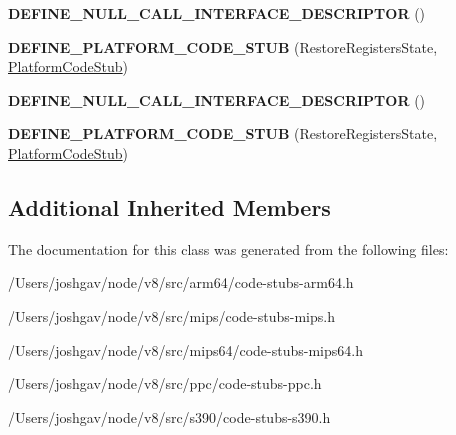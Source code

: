 \begin{DoxyCompactItemize}
\item 
{\bfseries D\+E\+F\+I\+N\+E\+\_\+\+N\+U\+L\+L\+\_\+\+C\+A\+L\+L\+\_\+\+I\+N\+T\+E\+R\+F\+A\+C\+E\+\_\+\+D\+E\+S\+C\+R\+I\+P\+T\+OR} ()\hypertarget{classv8_1_1internal_1_1_restore_registers_state_stub_ad6078d999bf4bc05859c3383b8b806f1}{}\label{classv8_1_1internal_1_1_restore_registers_state_stub_ad6078d999bf4bc05859c3383b8b806f1}

\item 
{\bfseries D\+E\+F\+I\+N\+E\+\_\+\+P\+L\+A\+T\+F\+O\+R\+M\+\_\+\+C\+O\+D\+E\+\_\+\+S\+T\+UB} (Restore\+Registers\+State, \hyperlink{classv8_1_1internal_1_1_platform_code_stub}{Platform\+Code\+Stub})\hypertarget{classv8_1_1internal_1_1_restore_registers_state_stub_a713ec890992c39eb89c6334070f5dbe4}{}\label{classv8_1_1internal_1_1_restore_registers_state_stub_a713ec890992c39eb89c6334070f5dbe4}

\item 
{\bfseries D\+E\+F\+I\+N\+E\+\_\+\+N\+U\+L\+L\+\_\+\+C\+A\+L\+L\+\_\+\+I\+N\+T\+E\+R\+F\+A\+C\+E\+\_\+\+D\+E\+S\+C\+R\+I\+P\+T\+OR} ()\hypertarget{classv8_1_1internal_1_1_restore_registers_state_stub_ad6078d999bf4bc05859c3383b8b806f1}{}\label{classv8_1_1internal_1_1_restore_registers_state_stub_ad6078d999bf4bc05859c3383b8b806f1}

\item 
{\bfseries D\+E\+F\+I\+N\+E\+\_\+\+P\+L\+A\+T\+F\+O\+R\+M\+\_\+\+C\+O\+D\+E\+\_\+\+S\+T\+UB} (Restore\+Registers\+State, \hyperlink{classv8_1_1internal_1_1_platform_code_stub}{Platform\+Code\+Stub})\hypertarget{classv8_1_1internal_1_1_restore_registers_state_stub_a713ec890992c39eb89c6334070f5dbe4}{}\label{classv8_1_1internal_1_1_restore_registers_state_stub_a713ec890992c39eb89c6334070f5dbe4}

\end{DoxyCompactItemize}
\subsection*{Additional Inherited Members}


The documentation for this class was generated from the following files\+:\begin{DoxyCompactItemize}
\item 
/\+Users/joshgav/node/v8/src/arm64/code-\/stubs-\/arm64.\+h\item 
/\+Users/joshgav/node/v8/src/mips/code-\/stubs-\/mips.\+h\item 
/\+Users/joshgav/node/v8/src/mips64/code-\/stubs-\/mips64.\+h\item 
/\+Users/joshgav/node/v8/src/ppc/code-\/stubs-\/ppc.\+h\item 
/\+Users/joshgav/node/v8/src/s390/code-\/stubs-\/s390.\+h\end{DoxyCompactItemize}
